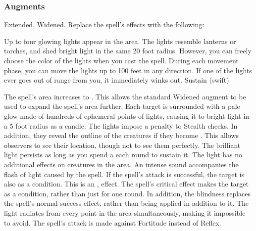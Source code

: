 \subsubsection{Augments}
 Extended, Widened.
Replace
the spell's effects with the following:
\begin{augmenteffects}
\spelleffect
Up to four glowing lights appear in the area.
The lights resemble lanterns or torches, and shed bright light in the same 20 foot radius.
However, you can freely choose the color of the lights when you cast the spell.
During each movement phase, you can move the lights up to 100 feet in any direction.
If one of the lights ever goes out of range from you, it immediately winks out.
\spelldur Sustain (swift)
\end{augmenteffects}
The spell's area increases to \areasmall.
This allows the standard Widened augment to be used to expand the spell's area further.
Each target is surrounded with a pale glow made of hundreds of ephemeral points of lights, causing it to bright light in a 5 foot radius as a candle.
The lights impose a  penalty to Stealth checks.
In addition, they reveal the outline of the creatures if they become .
This allows observers to see their location, though not to see them perfectly.
The brilliant light persists as long as you spend a  each round to sustain it.
The light has no additional effects on creatures in the area.
An intense sound accompanies the flash of light caused by the spell.
If the spell's attack is successful, the target is also \deafened as a condition.
This is an ,  effect.
The spell's critical effect makes the target \blind as a condition, rather than just for one round.
In addition, the blindness replaces the spell's normal success effect, rather than being applied in addition to it.
The light radiates from every point in the area simultaneously, making it impossible to avoid.
The spell's attack is made against Fortitude instead of Reflex.
